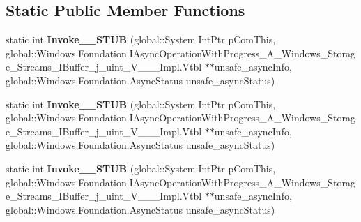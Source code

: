 \subsection*{Static Public Member Functions}
\begin{DoxyCompactItemize}
\item 
\mbox{\label{struct_windows_1_1_foundation_1_1_async_operation_with_progress_completed_handler___a___windows_7e4a9a933abf5a83a91ddfaf1616265a_a16e25704b89a4dcdb4a5c760d338a0f4}} 
static int {\bfseries Invoke\+\_\+\+\_\+\+S\+T\+UB} (global\+::\+System.\+Int\+Ptr p\+Com\+This, global\+::\+Windows.\+Foundation.\+I\+Async\+Operation\+With\+Progress\+\_\+\+A\+\_\+\+Windows\+\_\+\+Storage\+\_\+\+Streams\+\_\+\+I\+Buffer\+\_\+j\+\_\+uint\+\_\+\+V\+\_\+\+\_\+\+\_\+\+Impl.\+Vtbl $\ast$$\ast$unsafe\+\_\+async\+Info, global\+::\+Windows.\+Foundation.\+Async\+Status unsafe\+\_\+async\+Status)
\item 
\mbox{\label{struct_windows_1_1_foundation_1_1_async_operation_with_progress_completed_handler___a___windows_7e4a9a933abf5a83a91ddfaf1616265a_a16e25704b89a4dcdb4a5c760d338a0f4}} 
static int {\bfseries Invoke\+\_\+\+\_\+\+S\+T\+UB} (global\+::\+System.\+Int\+Ptr p\+Com\+This, global\+::\+Windows.\+Foundation.\+I\+Async\+Operation\+With\+Progress\+\_\+\+A\+\_\+\+Windows\+\_\+\+Storage\+\_\+\+Streams\+\_\+\+I\+Buffer\+\_\+j\+\_\+uint\+\_\+\+V\+\_\+\+\_\+\+\_\+\+Impl.\+Vtbl $\ast$$\ast$unsafe\+\_\+async\+Info, global\+::\+Windows.\+Foundation.\+Async\+Status unsafe\+\_\+async\+Status)
\item 
\mbox{\label{struct_windows_1_1_foundation_1_1_async_operation_with_progress_completed_handler___a___windows_7e4a9a933abf5a83a91ddfaf1616265a_a16e25704b89a4dcdb4a5c760d338a0f4}} 
static int {\bfseries Invoke\+\_\+\+\_\+\+S\+T\+UB} (global\+::\+System.\+Int\+Ptr p\+Com\+This, global\+::\+Windows.\+Foundation.\+I\+Async\+Operation\+With\+Progress\+\_\+\+A\+\_\+\+Windows\+\_\+\+Storage\+\_\+\+Streams\+\_\+\+I\+Buffer\+\_\+j\+\_\+uint\+\_\+\+V\+\_\+\+\_\+\+\_\+\+Impl.\+Vtbl $\ast$$\ast$unsafe\+\_\+async\+Info, global\+::\+Windows.\+Foundation.\+Async\+Status unsafe\+\_\+async\+Status)
$$
\end{DoxyCompactItemize}

